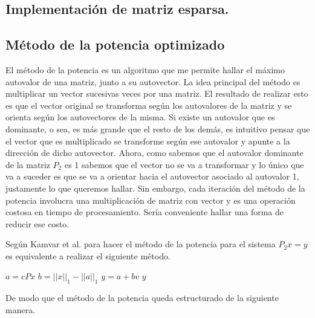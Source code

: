 \subsection{Implementaci\'on de matriz esparsa.}


\subsection{M\'etodo de la potencia optimizado}

El m\'etodo de la potencia \cite[Secci\'on 9.3]{Burden} es un algoritmo que me permite hallar el m\'aximo autovalor de una matriz, junto a su autovector. La idea principal del m\'etodo es multiplicar un vector sucesivas veces por una matriz. El resultado de realizar esto es que el vector original se transforma seg\'un los autovalores de la matriz y se orienta seg\'un los autovectores de la misma. Si existe un autovalor que es dominante, o sea, es m\'as grande que el resto de los dem\'as, es intuitivo pensar que el vector que es multiplicado se transforme seg\'un ese autovalor y apunte a la direcci\'on de dicho autovector. Ahora, como sabemos que el autovalor dominante de la matriz $P_{2}$ es 1 sabemos que el vector no se va a transformar y lo \'unico que va a suceder es que se va a orientar hacia el autovector asociado al autovalor 1, justamente lo que queremos hallar. Sin embargo, cada iteraci\'on del m\'etodo de la potencia involucra una multiplicaci\'on de matriz con vector y es una operaci\'on costosa en tiempo de procesamiento. Ser\'ia conveniente hallar una forma de reducir ese costo.

Seg\'un Kamvar et al. \cite[Algoritmo 1]{Kamvar2003} para hacer el m\'etodo de la potencia para el sistema $P_{2}x = y$ es equivalente a realizar el siguiente m\'etodo.

\vspace{0.5cm}

\begin{algorithmic}
		\State $a = cPx$
		\State $b = ||x||_{1} - ||a||_{1}$
		\State $y = a + bv$
		\State \Return $y$
	\EndFunction
\end{algorithmic}

\vspace{0.5cm}

De modo que el m\'etodo de la potencia queda estructurado de la siguiente manera.

\vspace{0.5cm}

